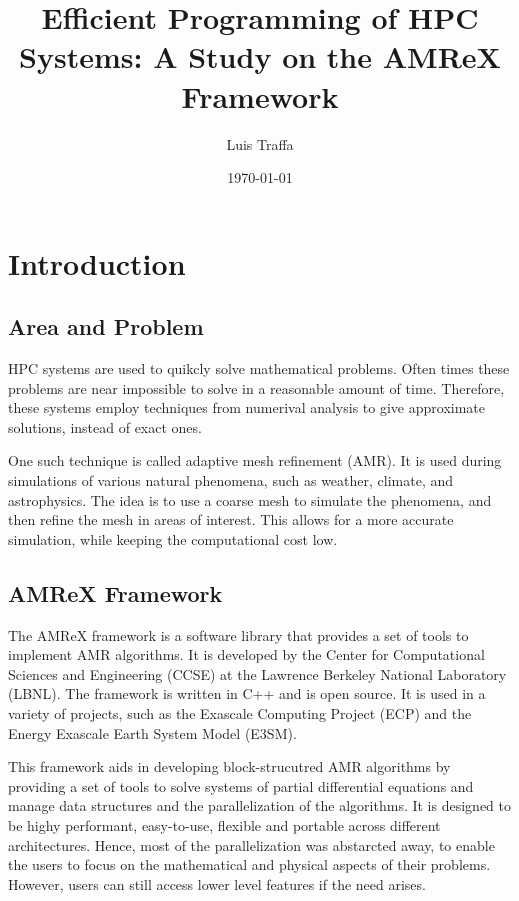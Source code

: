 \documentclass[12pt, a4paper]{article}
\title{Efficient Programming of HPC Systems: A Study on the AMReX Framework}
\author{Luis Traffa}
\date{\today}
\begin{document}
\maketitle
\tableofcontents

\clearpage

\section{Introduction}
\subsection{Area and Problem}

HPC systems are used to quikcly solve mathematical problems. Often times 
these problems are near impossible to solve in a reasonable amount of time.
Therefore, these systems employ techniques from numerival analysis to give approximate solutions,
instead of exact ones. 

One such technique is called adaptive mesh refinement (AMR). It is used during simulations of various natural 
phenomena, such as weather, climate, and astrophysics. The idea is to use a coarse mesh to simulate the
phenomena, and then refine the mesh in areas of interest. This allows for a more accurate simulation, while
keeping the computational cost low.


\subsection{AMReX Framework}

The AMReX framework is a software library that provides a set of tools to implement AMR algorithms.
It is developed by the Center for Computational Sciences and Engineering (CCSE) at the Lawrence Berkeley National Laboratory (LBNL).
The framework is written in C++ and is open source. It is used in a variety of projects, such as the
Exascale Computing Project (ECP) and the Energy Exascale Earth System Model (E3SM).

This framework aids in developing block-strucutred AMR algorithms by providing a set of tools to
solve systems of partial differential equations and manage data structures and the parallelization of the algorithms.
It is designed to be highy performant, easy-to-use, flexible and portable across different architectures.
Hence, most of the parallelization was abstarcted away, to enable the users to focus on the mathematical and physical
aspects of their problems. However, users can still access lower level features if the need arises.
\end{document}
